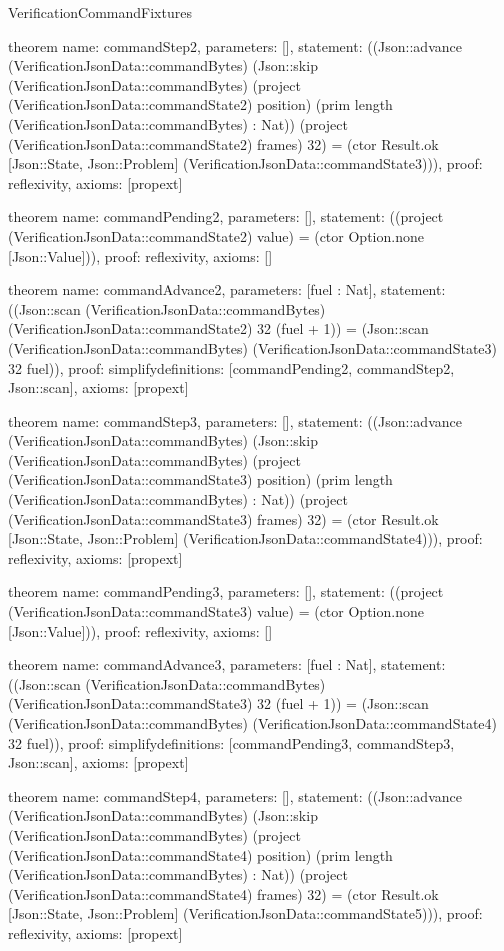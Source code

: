 \begin{lexlean}{VerificationCommandFixtures}
\begin{semanticmodule}
theorem{
  name: commandStep2,
  parameters: [],
  statement: ((Json::advance (VerificationJsonData::commandBytes) (Json::skip (VerificationJsonData::commandBytes) (project (VerificationJsonData::commandState2) position) (prim length (VerificationJsonData::commandBytes) : Nat)) (project (VerificationJsonData::commandState2) frames) 32) = (ctor Result.ok [Json::State, Json::Problem] (VerificationJsonData::commandState3))),
  proof: reflexivity{},
  axioms: [propext]
}

theorem{
  name: commandPending2,
  parameters: [],
  statement: ((project (VerificationJsonData::commandState2) value) = (ctor Option.none [Json::Value])),
  proof: reflexivity{},
  axioms: []
}

theorem{
  name: commandAdvance2,
  parameters: [fuel : Nat],
  statement: ((Json::scan (VerificationJsonData::commandBytes) (VerificationJsonData::commandState2) 32 (fuel + 1)) = (Json::scan (VerificationJsonData::commandBytes) (VerificationJsonData::commandState3) 32 fuel)),
  proof: simplify{definitions: [commandPending2, commandStep2, Json::scan]},
  axioms: [propext]
}

theorem{
  name: commandStep3,
  parameters: [],
  statement: ((Json::advance (VerificationJsonData::commandBytes) (Json::skip (VerificationJsonData::commandBytes) (project (VerificationJsonData::commandState3) position) (prim length (VerificationJsonData::commandBytes) : Nat)) (project (VerificationJsonData::commandState3) frames) 32) = (ctor Result.ok [Json::State, Json::Problem] (VerificationJsonData::commandState4))),
  proof: reflexivity{},
  axioms: [propext]
}

theorem{
  name: commandPending3,
  parameters: [],
  statement: ((project (VerificationJsonData::commandState3) value) = (ctor Option.none [Json::Value])),
  proof: reflexivity{},
  axioms: []
}

theorem{
  name: commandAdvance3,
  parameters: [fuel : Nat],
  statement: ((Json::scan (VerificationJsonData::commandBytes) (VerificationJsonData::commandState3) 32 (fuel + 1)) = (Json::scan (VerificationJsonData::commandBytes) (VerificationJsonData::commandState4) 32 fuel)),
  proof: simplify{definitions: [commandPending3, commandStep3, Json::scan]},
  axioms: [propext]
}

theorem{
  name: commandStep4,
  parameters: [],
  statement: ((Json::advance (VerificationJsonData::commandBytes) (Json::skip (VerificationJsonData::commandBytes) (project (VerificationJsonData::commandState4) position) (prim length (VerificationJsonData::commandBytes) : Nat)) (project (VerificationJsonData::commandState4) frames) 32) = (ctor Result.ok [Json::State, Json::Problem] (VerificationJsonData::commandState5))),
  proof: reflexivity{},
  axioms: [propext]
}


\end{semanticmodule}
\end{lexlean}
